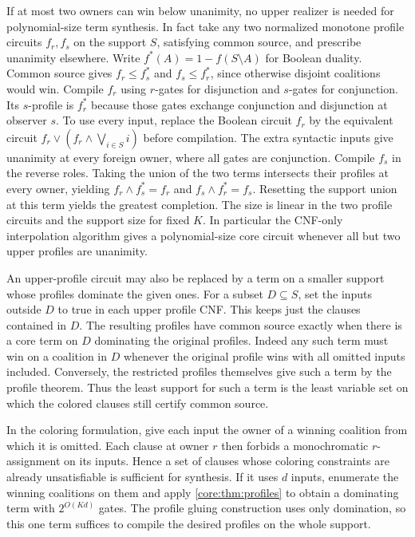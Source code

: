 If at most two owners can win below unanimity, no upper
realizer is needed for polynomial-size term synthesis.
In fact take any two normalized monotone profile circuits
$f_r,f_s$ on the support $S$, satisfying common source,
and prescribe unanimity elsewhere. Write
$f^*(A)=1-f(S\setminus A)$ for Boolean duality.
Common source gives $f_r\le f_s^*$ and $f_s\le f_r^*$,
since otherwise disjoint coalitions would win.
Compile $f_r$ using $r$-gates for disjunction and
$s$-gates for conjunction. Its $s$-profile is $f_r^*$
because those gates exchange conjunction and disjunction
at observer $s$. To use every input, replace the Boolean
circuit $f_r$ by the equivalent circuit
$f_r\lor(f_r\land\bigvee_{i\in S}i)$ before compilation.
The extra syntactic inputs give unanimity at every
foreign owner, where all gates are conjunction.
Compile $f_s$ in the reverse roles. Taking the union
of the two terms intersects their profiles at every
owner, yielding $f_r\land f_s^*=f_r$ and
$f_s\land f_r^*=f_s$. Resetting the support union at
this term yields the greatest completion. The size
is linear in the two profile circuits and the support
size for fixed $K$. In particular the CNF-only
interpolation algorithm gives a polynomial-size core
circuit whenever all but two upper profiles are
unanimity.

An upper-profile circuit may also be replaced by a
term on a smaller support whose profiles dominate the
given ones. For a subset $D\subseteq S$, set the inputs
outside $D$ to true in each upper profile CNF. This
keeps just the clauses contained in $D$. The resulting
profiles have common source exactly when there is a
core term on $D$ dominating the original profiles.
Indeed any such term must win on a coalition in $D$
whenever the original profile wins with all omitted
inputs included. Conversely, the restricted profiles
themselves give such a term by the profile theorem.
Thus the least support for such a term is the least
variable set on which the colored clauses still
certify common source.

In the coloring formulation, give each input the owner
of a winning coalition from which it is omitted. Each
clause at owner $r$ then forbids a monochromatic
$r$-assignment on its inputs. Hence a set of clauses
whose coloring constraints are already unsatisfiable
is sufficient for synthesis. If it uses $d$ inputs,
enumerate the winning coalitions on them and apply
\cref{core:thm:profiles} to obtain a dominating term
with $2^{O(Kd)}$ gates. The profile gluing construction
uses only domination, so this one term suffices to
compile the desired profiles on the whole support.

